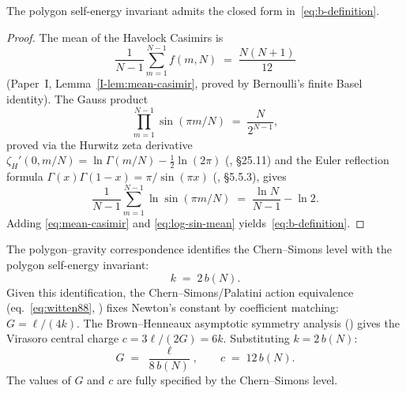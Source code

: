 \begin{lemma}
\label{lem:bN-closed-form}
The polygon self-energy invariant admits the closed form
in~\eqref{eq:b-definition}.
\end{lemma}

\begin{proof}
The mean of the Havelock Casimirs is
\begin{equation}\label{eq:mean-casimir}
  \frac{1}{N{-}1}\sum_{m=1}^{N-1} f(m,N)
  \;=\; \frac{N(N{+}1)}{12}
\end{equation}
(Paper~I, Lemma~\ref*{I-lem:mean-casimir}, proved by
Bernoulli's finite Basel identity).
The Gauss product
\begin{equation}\label{eq:gauss-product}
  \prod_{m=1}^{N-1}\sin(\pi m/N)
  \;=\; \frac{N}{2^{N-1}},
\end{equation}
proved via the Hurwitz zeta derivative
$\zeta_H'(0, m/N) = \ln\Gamma(m/N) - \tfrac{1}{2}\ln(2\pi)$
(\citealt{DLMF}, \S25.11) and the Euler reflection formula
$\Gamma(x)\Gamma(1{-}x) = \pi/\sin(\pi x)$
(\citealt{DLMF}, \S5.5.3), gives
\begin{equation}\label{eq:log-sin-mean}
  \frac{1}{N{-}1}\sum_{m=1}^{N-1}\ln\sin(\pi m/N)
  \;=\; \frac{\ln N}{N{-}1} - \ln 2.
\end{equation}
Adding \eqref{eq:mean-casimir} and \eqref{eq:log-sin-mean}
yields~\eqref{eq:b-definition}.
\end{proof}

\begin{proposition}
\label{prop:central-charge}
The polygon--gravity correspondence identifies the
Chern--Simons level with the polygon self-energy invariant:
\begin{equation}\label{eq:k-identification}
  k \;=\; 2\,b(N).
\end{equation}
Given this identification, the Chern--Simons/Palatini
action equivalence
(eq.~\eqref{eq:witten88}, \citealt{Witten1988}) fixes
Newton's constant by coefficient matching:
$G = \ell/(4k)$. The Brown--Henneaux asymptotic
symmetry analysis (\citealt{BrownHenneaux1986}) gives
the Virasoro central charge $c = 3\ell/(2G) = 6k$.
Substituting $k = 2\,b(N)$:
\begin{equation}\label{eq:central-charge}
  G \;=\; \frac{\ell}{8\,b(N)},
  \qquad
  c \;=\; 12\,b(N).
\end{equation}
The values of $G$ and $c$ are fully specified by the
Chern--Simons level.
\end{proposition}


